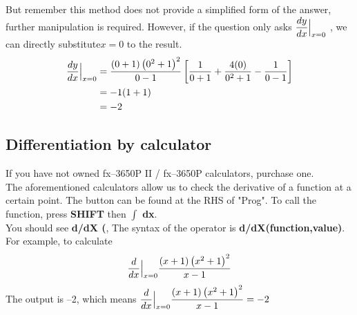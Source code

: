 \documentclass{article}
\begin{document}
But remember this method does not provide
a simplified form of the answer,
further manipulation is required.
However, if the question only asks
$\displaystyle \frac{dy}{dx}\Bigl|_{x=0}$
, we can directly substitute$x=0$ to the result.
\begin{equation*}
\begin{aligned}
    \frac{dy}{dx}\Bigl|_{x=0} & =\frac{( 0+1)\left( 0^{2} +1\right)^{2}}{0-1}\left[\frac{1}{0+1} +\frac{4( 0)}{0^{2} +1} -\frac{1}{0-1}\right]\\
    & =-1( 1+1)\\
    & =-2
\end{aligned}
\end{equation*}
\subsection{Differentiation by calculator}
If you have not owned fx–3650P II / fx–3650P calculators, purchase one.\\
The aforementioned calculators allow us
to check the derivative of a function at
a certain point. The button can be found
at the RHS of "Prog". To call the function,
press \textbf{SHIFT} then $\int$ \textbf{dx}.\\
You should see \textbf{d/dX (}, The syntax of the operator is
\textbf{d/dX(function,value)}.\\
For example, to calculate
\begin{equation*}
    \frac{d}{dx}\Bigl|_{x=0}\frac{( x+1)\left( x^{2} +1\right)^{2}}{x-1}
\end{equation*}
The output is –2, which means $\displaystyle \frac{d}{dx}\Bigl|_{x=0}\frac{( x+1)\left( x^{2} +1\right)^{2}}{x-1} =-2$
\end{document}
